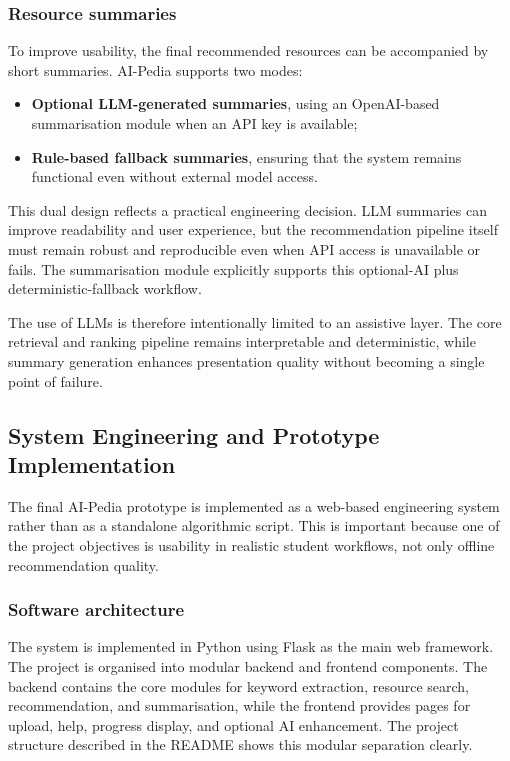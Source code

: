 \documentclass[10pt,journal,compsoc]{IEEEtran}
\begin{document}
\subsubsection{Resource summaries}

To improve usability, the final recommended resources can be accompanied by short summaries. AI-Pedia supports two modes:

\begin{itemize}
\item \textbf{Optional LLM-generated summaries}, using an OpenAI-based summarisation module when an API key is available;
\item \textbf{Rule-based fallback summaries}, ensuring that the system remains functional even without external model access.
\end{itemize}

This dual design reflects a practical engineering decision. LLM summaries can improve readability and user experience, but the recommendation pipeline itself must remain robust and reproducible even when API access is unavailable or fails. The summarisation module explicitly supports this optional-AI plus deterministic-fallback workflow.

The use of LLMs is therefore intentionally limited to an assistive layer. The core retrieval and ranking pipeline remains interpretable and deterministic, while summary generation enhances presentation quality without becoming a single point of failure.

\subsection{System Engineering and Prototype Implementation}

The final AI-Pedia prototype is implemented as a web-based engineering system rather than as a standalone algorithmic script. This is important because one of the project objectives is usability in realistic student workflows, not only offline recommendation quality.

\subsubsection{Software architecture}

The system is implemented in Python using Flask as the main web framework. The project is organised into modular backend and frontend components. The backend contains the core modules for keyword extraction, resource search, recommendation, and summarisation, while the frontend provides pages for upload, help, progress display, and optional AI enhancement. The project structure described in the README shows this modular separation clearly.
\end{document}

